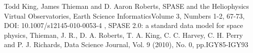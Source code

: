 \begin{thebibliography}{2}
 Todd King, James Thieman and D. Aaron Roberts, SPASE and the Heliophysics Virtual Observatories,
Earth Science InformaticsVolume 3, Numbers 1-2, 67-73, DOI: 10.1007/s12145-010-0053-4 , SPASE 2.0: a standard data model for space physics, 
 Thieman, J. R., D. A. Roberts, T. A. King, C. C. Harvey, C. H. Perry and P. J. Richards,
Data Science Journal, Vol. 9 (2010), No. 0, pp.IGY85-IGY93 
\end{thebibliography} 
